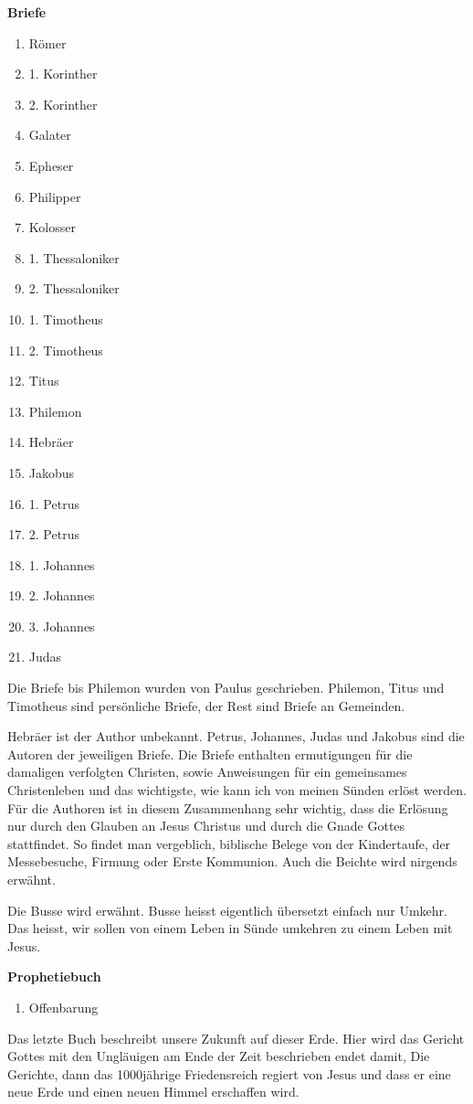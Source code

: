 \textbf{Briefe}
\begin{enumerate}
  \item Römer
  \item 1. Korinther
  \item 2. Korinther
  \item Galater
  \item Epheser
  \item Philipper
  \item Kolosser
  \item 1. Thessaloniker
  \item 2. Thessaloniker
  \item 1. Timotheus
  \item 2. Timotheus
  \item Titus 
  \item Philemon
  \item Hebräer
  \item Jakobus
  \item 1. Petrus
  \item 2. Petrus
  \item 1. Johannes
  \item 2. Johannes
  \item 3. Johannes
  \item Judas
\end{enumerate}
Die Briefe bis Philemon wurden von Paulus geschrieben. Philemon, Titus und Timotheus sind persönliche Briefe, der Rest sind Briefe an Gemeinden.

Hebräer ist der Author unbekannt. Petrus, Johannes, Judas und Jakobus sind die Autoren der jeweiligen Briefe. Die Briefe enthalten ermutigungen für die damaligen verfolgten Christen, sowie Anweisungen für ein gemeinsames Christenleben und das wichtigste, wie kann ich von meinen Sünden erlöst werden. Für die Authoren ist in diesem Zusammenhang sehr wichtig, dass die Erlösung nur durch den Glauben an Jesus Christus und durch die Gnade Gottes stattfindet. So findet man vergeblich, biblische Belege von der Kindertaufe, der Messebesuche, Firmung oder Erste Kommunion. Auch die Beichte wird nirgends erwähnt.

Die Busse wird erwähnt. Busse heisst eigentlich übersetzt einfach nur Umkehr. Das heisst, wir sollen von einem Leben in Sünde umkehren zu einem Leben mit Jesus.

\textbf{Prophetiebuch}
\begin{enumerate}
  \item Offenbarung
\end{enumerate}
Das letzte Buch beschreibt unsere Zukunft auf dieser Erde. Hier wird das Gericht Gottes mit den Ungläuigen am Ende der Zeit beschrieben endet damit, Die Gerichte, dann das 1000jährige Friedensreich regiert von Jesus und dass er eine neue Erde und einen neuen Himmel erschaffen wird.

